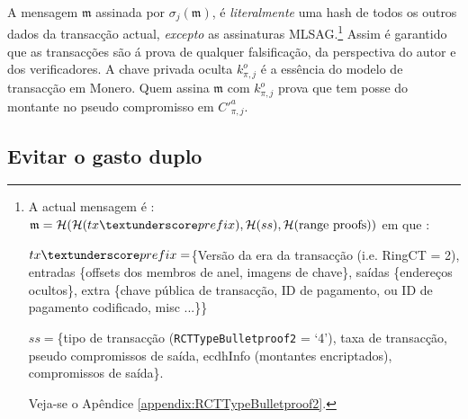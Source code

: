A mensagem $\mathfrak{m}$ assinada por $\sigma_j(\mathfrak{m})$, é {\em literalmente} uma hash de todos os outros dados da transacção actual, {\em excepto} as assinaturas MLSAG.\footnote{A actual mensagem é :$\mathfrak{m} = \mathcal{H}(\mathcal{H}(tx\textunderscore prefix),\mathcal{H}(ss),\mathcal{H}(\text{range proofs}))$ em que :\par
$tx\textunderscore prefix = $\{Versão da era da transacção (i.e. RingCT = 2), entradas \{offsets dos membros de anel, imagens de chave\}, saídas \{endereços ocultos\}, extra \{chave pública de transacção, ID de pagamento, ou ID de pagamento codificado, misc ...\}\}\par
$ss = $\{tipo de transacção ({\tt RCTTypeBulletproof2} = `4'), taxa de transacção, pseudo compromissos de saída, ecdhInfo (montantes encriptados), compromissos de saída\}.\par
Veja-se o Apêndice \ref{appendix:RCTTypeBulletproof2}.} 
Assim é garantido que as transacções são á prova de qualquer falsificação, da perspectiva do autor e dos verificadores.
A chave privada oculta $k^o_{\pi,j}$ é a essência do modelo de transacção em Monero. Quem assina $\mathfrak{m}$ com $k^o_{\pi,j}$ prova que tem posse do montante no pseudo compromisso em $C'^a_{\pi, j}$.
\subsection{Evitar o gasto duplo}

